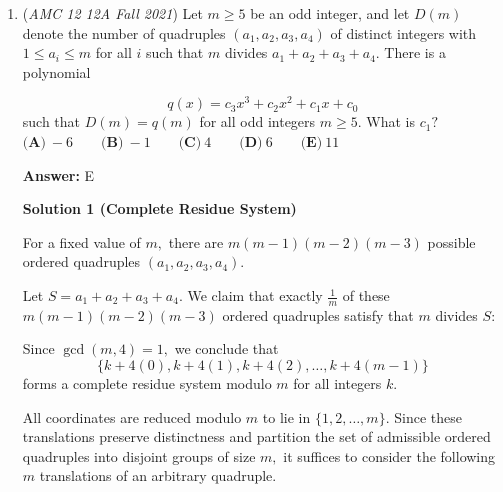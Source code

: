 \begin{enumerate}
 $\textbf{Case 6}$: $AD < CD < BC < AB$.

 By doing the similar analysis, we can show there is no solution in this case.

 $\textbf{Case 7}$: $AD < BC < CD < AB$.

 By doing the similar analysis, we can show there is no solution in this case.

 Therefore, the sum of all possible values of $a$ is
 \begin{align*} 18 + \left( 3 + 8 + 13 \right) + \left( 12 + 14 + 16 \right) & = 84 . \end{align*}


 Therefore, the answer is $\boxed{\textbf{(E) } 84}$.

 www.professorchenedu.com

 


	\item (\textit{AMC 12 12A Fall 2021}) Let $m\ge 5$ be an odd integer, and let $D(m)$ denote the number of quadruples $(a_1, a_2, a_3, a_4)$ of distinct integers with $1\le a_i \le m$ for all $i$ such that $m$ divides $a_1+a_2+a_3+a_4$. There is a polynomial

 \[q(x) = c_3x^3+c_2x^2+c_1x+c_0\]such that $D(m) = q(m)$ for all odd integers $m\ge 5$. What is $c_1?$
$\textbf{(A)}\ {-}6\qquad\textbf{(B)}\ {-}1\qquad\textbf{(C)}\ 4\qquad\textbf{(D)}\ 6\qquad\textbf{(E)}\ 11$

 \textbf{Answer: }E



\textbf{Solution 1 (Complete Residue System)}

For a fixed value of $m,$ there are $m(m-1)(m-2)(m-3)$ possible ordered quadruples $(a_1, a_2, a_3, a_4).$

 Let $S=a_1+a_2+a_3+a_4.$ We claim that exactly $\frac1m$ of these $m(m-1)(m-2)(m-3)$ ordered quadruples satisfy that $m$ divides $S:$

 Since $\gcd(m,4)=1,$ we conclude that 
 \[\{k+4(0),k+4(1),k+4(2),\ldots,k+4(m-1)\}\] forms a complete residue system modulo $m$ for all integers $k.$

 All coordinates are reduced modulo $m$ to lie in $\{1,2,\ldots,m\}.$ Since these translations preserve distinctness and partition the set of admissible ordered quadruples into disjoint groups of size $m,$ it suffices to consider the following $m$ translations of an arbitrary quadruple.


\end{enumerate}
